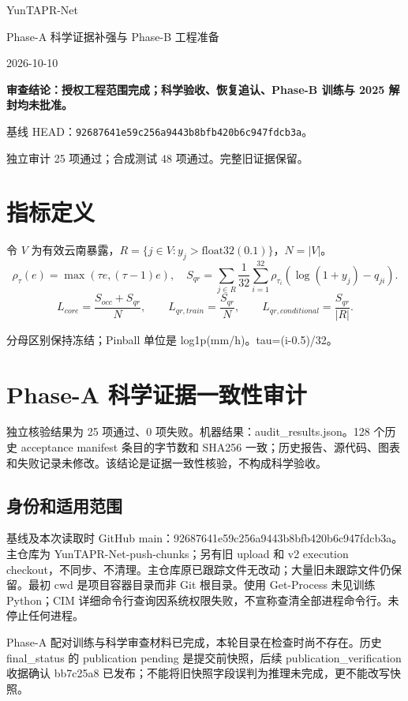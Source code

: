 \documentclass[UTF8,a4paper,10pt,fontset=fandol]{ctexart}
\begin{document}
\begin{center}{\LARGE YunTAPR-Net}\par{\Large Phase-A 科学证据补强与 Phase-B 工程准备}\par 2026-10-10\end{center}
\textbf{审查结论：授权工程范围完成；科学验收、恢复追认、Phase-B 训练与 2025 解封均未批准。}
\par 基线 HEAD：\texttt{92687641e59c256a9443b8bfb420b6c947fdcb3a}。
\par 独立审计 25 项通过；合成测试 48 项通过。完整旧证据保留。
\section*{指标定义}
令 $V$ 为有效云南暴露，$R=\{j\in V:y_j>\mathrm{float32}(0.1)\}$，$N=|V|$。
\[
\rho_\tau(e)=\max(\tau e,(\tau-1)e),\quad
S_{qr}=\sum_{j\in R}\frac1{32}\sum_{i=1}^{32}\rho_{\tau_i}(\log(1+y_j)-q_{ji}).
\]
\[
L_{core}=\frac{S_{occ}+S_{qr}}N,\qquad
L_{qr,train}=\frac{S_{qr}}N,\qquad
L_{qr,conditional}=\frac{S_{qr}}{|R|}.
\]
\par 分母区别保持冻结；Pinball 单位是 log1p(mm/h)。tau=(i-0.5)/32。
\clearpage
\section*{Phase-A 科学证据一致性审计}

独立核验结果为 25 项通过、0 项失败。机器结果：audit\_results.json。128 个历史 acceptance manifest 条目的字节数和 SHA256 一致；历史报告、源代码、图表和失败记录未修改。该结论是证据一致性核验，不构成科学验收。\par

\subsection*{身份和适用范围}

基线及本次读取时 GitHub main：92687641e59c256a9443b8bfb420b6c947fdcb3a。主仓库为 YunTAPR-Net-push-chunks；另有旧 upload 和 v2 execution checkout，不同步、不清理。主仓库原已跟踪文件无改动；大量旧未跟踪文件仍保留。最初 cwd 是项目容器目录而非 Git 根目录。使用 Get-Process 未见训练 Python；CIM 详细命令行查询因系统权限失败，不宣称查清全部进程命令行。未停止任何进程。\par

Phase-A 配对训练与科学审查材料已完成，本轮目录在检查时尚不存在。历史 final\_status 的 publication pending 是提交前快照，后续 publication\_verification 收据确认 bb7c25a8 已发布；不能将旧快照字段误判为推理未完成，更不能改写快照。\par
\end{document}
